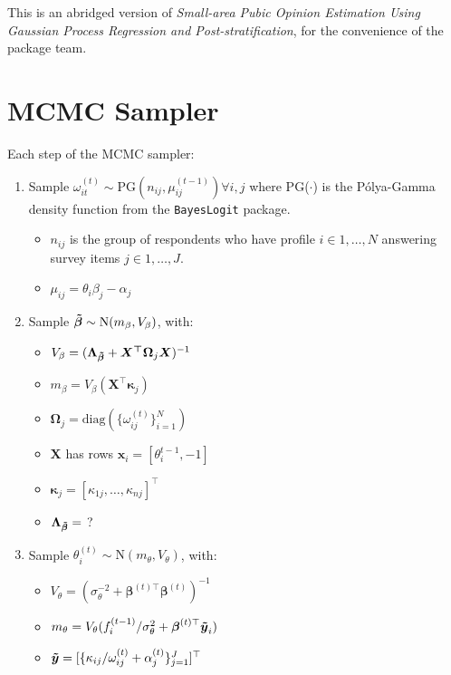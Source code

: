 \documentclass[12pt,letterpaper]{article}
\begin{document}
This is an abridged version of \textit{Small-area Pubic Opinion Estimation Using Gaussian Process Regression and Post-stratification}, for the convenience of the package team.
\section{MCMC Sampler}
Each step of the MCMC sampler:
\begin{enumerate}[(1)]
    \item Sample $\omega_{it}^{(t)} \sim \text{PG}(n_{ij}, \mu_{ij}^{(t-1)}) \forall i, j$ where PG($\cdot$) is the P\'olya-Gamma density function from the \texttt{BayesLogit} package. 
    \begin{itemize}
        \item $n_{ij}$ is the group of respondents who have profile $i \in 1,\dots, N$ answering survey items $j \in 1, \dots, J$.
        \item $\mu_{ij} = \theta_{i}\beta_{j} - \alpha_{j}$
    \end{itemize}
    \item Sample $\boldsymbol{\Tilde{\beta}} \sim \text{N}(m_{\beta}, V_{\beta})$, with:
    \begin{itemize}
        \item $V_{\beta} = (\boldsymbol{\Lambda_{\Tilde{\beta}}} + \boldsymbol{X^{\top}\Omega}_j\boldsymbol{X})^{-1}$
        \item $m_{\beta} = V_{\beta} (\boldsymbol{X}^{\top}\boldsymbol{\kappa}_j)$
        \item $\boldsymbol{\Omega}_j = \text{diag} (\{\omega_{ij}^{(t)}\}_{i = 1}^{N})$
        \item $\boldsymbol{X}$ has rows $\boldsymbol{x}_i = [\theta_{i}^{t-1}, -1]$
        \item $\boldsymbol{\kappa}_j = [\kappa_{1j}, \dots, \kappa_{nj}]^{\top}$
        \item $\boldsymbol{\Lambda_{\Tilde{\beta}}} =$ ?
    \end{itemize}
    \item Sample $\theta_{i}^{(t)} \sim \text{N}(m_{\theta}, V_{\theta})$, with:
    \begin{itemize}
        \item $V_{\theta} = (\sigma_{\theta}^{-2} + \boldsymbol{\beta}^{(t)\top}\boldsymbol{\beta}^{(t)})^{-1}$
        \item $m_{\theta} = V_{\theta} (f_{i}^{(t-1)} / \sigma_{\theta}^2 + \boldsymbol{\beta}^{(t)\top}\boldsymbol{\Tilde{y}}_i)$
        \item $\boldsymbol{\Tilde{y}} = [\{\kappa_{ij} / \omega_{ij}^{(t)} + \alpha_{j}^{(t)}\}_{j=1}^{J}]^{\top}$

\end{itemize}
\end{enumerate}
\end{document}
